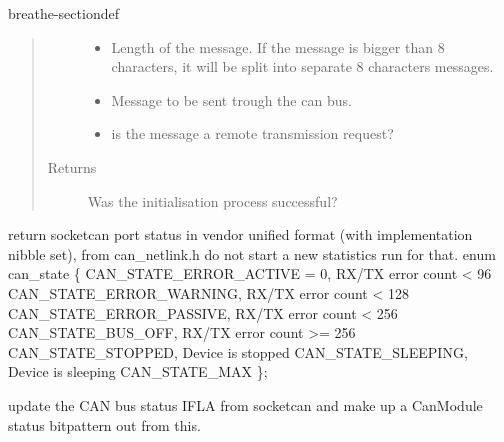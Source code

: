 \documentclass[a4paper,10pt,english]{sphinxmanual}
\begin{document}
\begin{fulllineitems}
\begin{sphinxuseclass}{breathe-sectiondef}
\begin{fulllineitems}
\begin{quote}
\begin{description}
\begin{itemize}
\item {} 
\sphinxAtStartPar
{} \textendash{} Length of the message. If the message is bigger than 8 characters, it will be split into separate 8 characters messages. 

\item {} 
\sphinxAtStartPar
{} \textendash{} Message to be sent trough the can bus. 

\item {} 
\sphinxAtStartPar
{} \textendash{} is the message a remote transmission request? 

\end{itemize}

\item[{Returns}] \leavevmode
\sphinxAtStartPar
Was the initialisation process successful?

\end{description}\end{quote}

\end{fulllineitems}


\begin{fulllineitems}
\label{\detokenize{classestracing:_CPPv4N12CSockCanScan13getPortStatusEv}}%
\pysigstartmultiline
{}%
\pysigstopmultiline
\sphinxAtStartPar
return socketcan port status in vendor unified format (with implementation nibble set), from can\_netlink.h do not start a new statistics run for that. enum can\_state \{ CAN\_STATE\_ERROR\_ACTIVE = 0, RX/TX error count \textless{} 96 CAN\_STATE\_ERROR\_WARNING, RX/TX error count \textless{} 128 CAN\_STATE\_ERROR\_PASSIVE, RX/TX error count \textless{} 256 CAN\_STATE\_BUS\_OFF, RX/TX error count \textgreater{}= 256 CAN\_STATE\_STOPPED, Device is stopped CAN\_STATE\_SLEEPING, Device is sleeping CAN\_STATE\_MAX \};

\sphinxAtStartPar
update the CAN bus status IFLA from socketcan and make up a CanModule status bitpattern out from this.


\end{fulllineitems}
\end{sphinxuseclass}
\end{fulllineitems}
\end{document}
